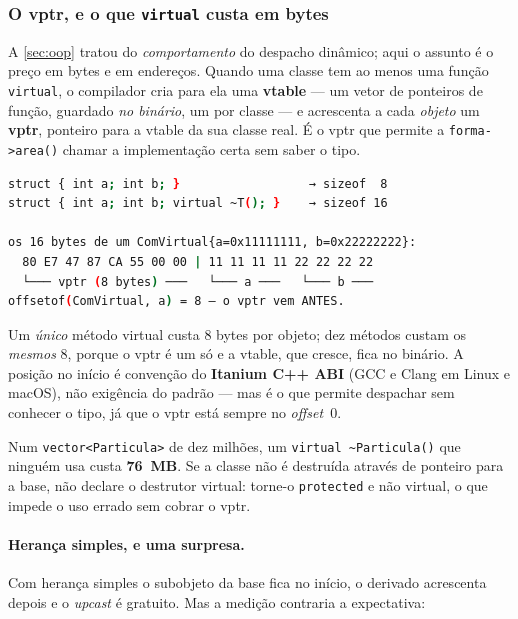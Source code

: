 \subsubsection{O vptr, e o que \texttt{virtual} custa em bytes}
\label{sec:layout-vptr}

A \cref{sec:oop} tratou do \emph{comportamento} do despacho dinâmico; aqui o
assunto é o preço em bytes e em endereços. Quando uma classe tem ao menos uma
função \texttt{virtual}, o compilador cria para ela uma \textbf{vtable} --- um
vetor de ponteiros de função, guardado \emph{no binário}, um por classe --- e
acrescenta a cada \emph{objeto} um \textbf{vptr}, ponteiro para a vtable da sua
classe real. É o vptr que permite a \texttt{forma->area()} chamar a
implementação certa sem saber o tipo.

\begin{lstlisting}[style=bt, language=bash,
    caption={Saída de \texttt{src/layout/}: o custo de um único
             \texttt{virtual}.}]
struct { int a; int b; }                  → sizeof  8
struct { int a; int b; virtual ~T(); }    → sizeof 16

os 16 bytes de um ComVirtual{a=0x11111111, b=0x22222222}:
  80 E7 47 87 CA 55 00 00 | 11 11 11 11 22 22 22 22
  └─── vptr (8 bytes) ───   └─── a ───   └─── b ───
offsetof(ComVirtual, a) = 8 — o vptr vem ANTES.
\end{lstlisting}

Um \emph{único} método virtual custa 8 bytes por objeto; dez métodos custam os
\emph{mesmos} 8, porque o vptr é um só e a vtable, que cresce, fica no binário.
A posição no início é convenção do \textbf{Itanium C++ ABI} (GCC e Clang em
Linux e macOS), não exigência do padrão --- mas é o que permite despachar sem
conhecer o tipo, já que o vptr está sempre no \emph{offset}~0.

\begin{regra}
Num \texttt{vector<Particula>} de dez milhões, um
\texttt{virtual~\textasciitilde Particula()} que ninguém usa custa
\textbf{76~MB}. Se a classe não é destruída através de ponteiro para a base, não
declare o destrutor virtual: torne-o \texttt{protected} e não virtual, o que
impede o uso errado sem cobrar o vptr.
\end{regra}

\paragraph{Herança simples, e uma surpresa.} Com herança simples o subobjeto da
base fica no início, o derivado acrescenta depois e o \emph{upcast} é gratuito.
Mas a medição contraria a expectativa:


